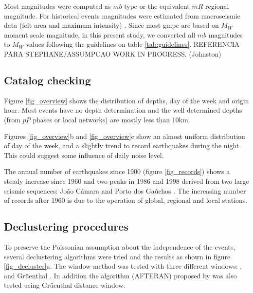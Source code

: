 \documentclass[draft, grl]{agutex}
\begin{document}
\begin{article}
Most magnitudes were computed as $mb$ type or the equivalent $mR$ \citep{assumpcao_1983} regional magnitude. For historical events magnitudes were estimated from macroseismic data (felt area and maximum intensity) \citep{berrocal_1984}. Since most \gls{gmpe} are based on $M_W$ moment scale magnitude, in this present study, we converted all $mb$ magnitudes to $M_W$ values following the guidelines on table \ref{tab:guidelines}. REFERENCIA PARA STEPHANE/ASSUMPCAO WORK IN PROGRESS. (Johnston)



\subsection{Catalog checking}

Figure \ref{fig_overview} shows the distribution of depths, day of the week and origin hour. Most events have no depth determination and the well determined depths (from $pP$ phases or local networks) are mostly less than 10km.

Figures \ref{fig_overview}b and \ref{fig_overview}c show an almost uniform distribution of day of the week, and a slightly trend to record earthquakes during the night. This could suggest some influence of daily noise level.

The annual number of earthquakes since 1900 (figure \ref{fig_records}) shows a steady increase since 1960 and two peaks in 1986 and 1998 derived from two large seismic sequences: João Câmara \citep{takeya_1989} and Porto dos Gaúchos \citep{barros_2009}. The increasing number of records after 1960 is due to the operation of global, regional and local stations.



\subsection{Declustering procedures}

To preserve the Poissonian assumption about the independence of the events, several declustering algorithms were tried and the results as shown in figure \ref{fig_decluster}a. The window-method \citep{gardner_1974} was tested with three different windows: \citet{gardner_1974}, \citet{uhrhammer_1986} and Gr\"uenthal \citep{van_stiphout_2012}.
In addition the algorithm (AFTERAN) proposed by \citet{musson_1999} was also tested using Gr\"uenthal distance window.


\end{article}
\end{document}
